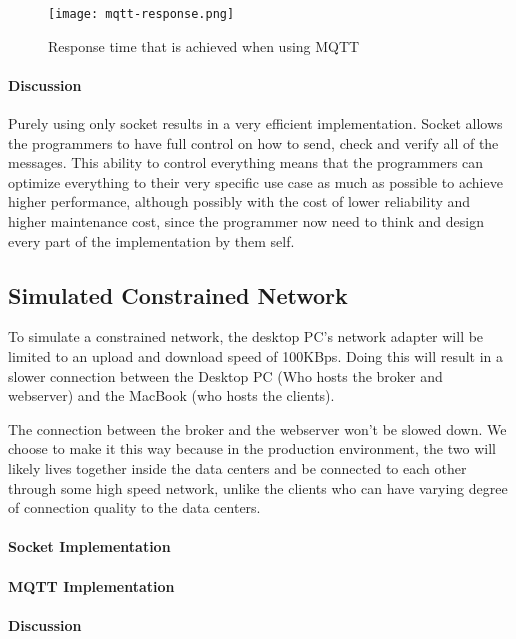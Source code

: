 \begin{figure}[h]
\centering
\texttt{[image: mqtt-response.png]}
\caption{Response time that is achieved when using MQTT}\label{fig:mqtt-response}
\end{figure}

\paragraph{Discussion}

Purely using only socket results in a very efficient implementation. Socket allows the programmers to have full control on how to send, check and verify all of the messages. This ability to control everything means that the programmers can optimize everything to their very specific use case as much as possible to achieve higher performance, although possibly with the cost of lower reliability and higher maintenance cost, since the programmer now need to think and design every part of the implementation by them self.

\subsection{Simulated Constrained Network}

To simulate a constrained network, the desktop PC's network adapter will be limited to an upload and download speed of 100KBps. Doing this will result in a slower connection between the Desktop PC (Who hosts the broker and webserver) and the MacBook (who hosts the clients). 

The connection between the broker and the webserver won't be slowed down. We choose to make it this way because in the production environment, the two will likely lives together inside the data centers and be connected to each other through some high speed network, unlike the clients who can have varying degree of connection quality to the data centers.

\paragraph{Socket Implementation}

\paragraph{MQTT Implementation}

\paragraph{Discussion}
